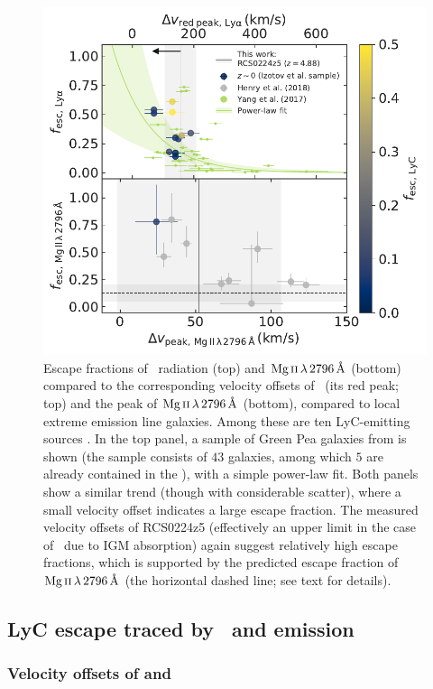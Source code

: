 \begin{figure}[t]
    \centering
    \includegraphics[width=0.6\linewidth]{"Plots/ChapterA/Lya-MgII_v_offsets_fesc"}
    \caption[Escape fractions compared to velocity offsets of \lya\ and $\MgII \, \lambda \, 2796 \, \Angstrom$]{Escape fractions of \lya\ radiation (top) and $\MgII \, \lambda \, 2796 \, \Angstrom$ (bottom) compared to the corresponding velocity offsets of \lya\ (its red peak; top) and the peak of $\MgII \, \lambda \, 2796 \, \Angstrom$ (bottom), compared to local extreme emission line galaxies. Among these are ten LyC-emitting sources \citep[the \Isample\ and][, coloured according to the escape fraction of LyC, if known]{2018ApJ...855...96H}. In the top panel, a sample of Green Pea galaxies from \citet{2016ApJ...820..130Y, 2017ApJ...844..171Y} is shown (the sample consists of $43$ galaxies, among which $5$ are already contained in the \Isample), with a simple power-law fit. Both panels show a similar trend (though with considerable scatter), where a small velocity offset indicates a large escape fraction. The measured velocity offsets of RCS0224z5 (effectively an upper limit in the case of \lya\ due to IGM absorption) again suggest relatively high escape fractions, which is supported by the predicted escape fraction of $\MgII \, \lambda \, 2796 \, \Angstrom$ (the horizontal dashed line; see text for details).
    }
    \label{chAfig:Lya/LyC-MgII escape and velocity offsets}
\end{figure}

\subsection{LyC escape traced by \texorpdfstring{\lya\ and \MgII}{\lyatext and Mg II} emission}
\label{chAssec:Discussion: Lya and MgII}

\subsubsection{Velocity offsets of \texorpdfstring{\lya}{\lyatext} and \texorpdfstring{\MgII}{Mg II}}
\label{chAsssec:Lya}

